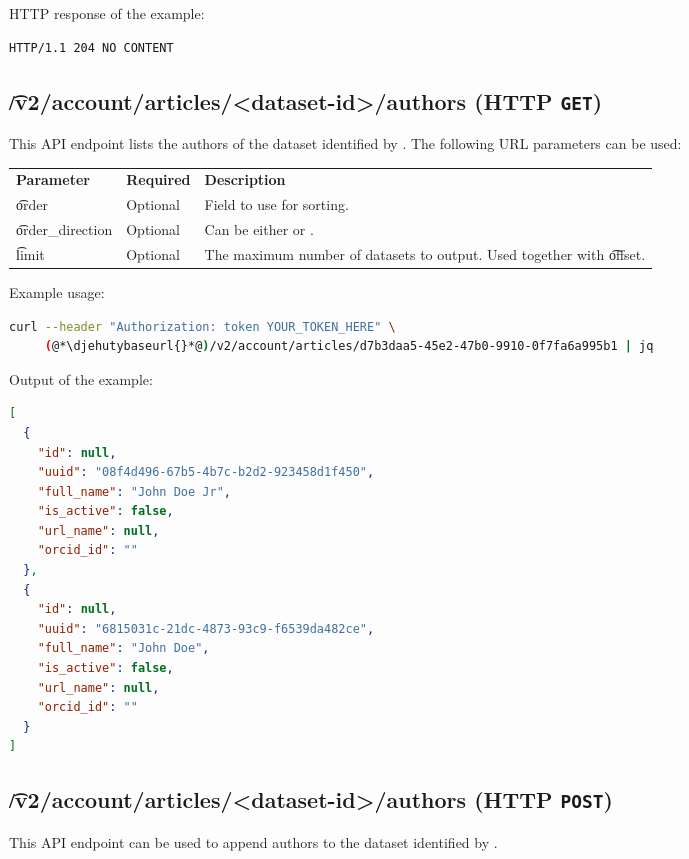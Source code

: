   HTTP response of the example:
\begin{lstlisting}
HTTP/1.1 204 NO CONTENT
\end{lstlisting}

\subsection{\t{/v2/account/articles/<dataset-id>/authors} (HTTP \texttt{GET})}
\label{sec:api-v2-articles-authors}

  This API endpoint lists the authors of the dataset identified by .
  The following URL parameters can be used:

\begin{tabularx}{\textwidth}{*{2}{!{\VRule[-1pt]}l}!{\VRule[-1pt]}X}
  \headrow
  \textbf{Parameter}   & \textbf{Required} & \textbf{Description}\\
  \t{order}            & Optional & Field to use for sorting.\\
  \t{order\_direction} & Optional & Can be either  or .\\
  \t{limit}            & Optional & The maximum number of datasets to output.
                                    Used together with \t{offset}.
\end{tabularx}

  Example usage:
\begin{lstlisting}[language=bash]
curl --header "Authorization: token YOUR_TOKEN_HERE" \
     (@*\djehutybaseurl{}*@)/v2/account/articles/d7b3daa5-45e2-47b0-9910-0f7fa6a995b1 | jq
\end{lstlisting}

  Output of the example:
\begin{lstlisting}[language=JSON]
[
  {
    "id": null,
    "uuid": "08f4d496-67b5-4b7c-b2d2-923458d1f450",
    "full_name": "John Doe Jr",
    "is_active": false,
    "url_name": null,
    "orcid_id": ""
  },
  {
    "id": null,
    "uuid": "6815031c-21dc-4873-93c9-f6539da482ce",
    "full_name": "John Doe",
    "is_active": false,
    "url_name": null,
    "orcid_id": ""
  }
]
\end{lstlisting}

\subsection{\t{/v2/account/articles/<dataset-id>/authors} (HTTP \texttt{POST})}
\label{sec:api-v2-articles-authors-post}

  This API endpoint can be used to append authors to the dataset identified
  by \code{dataset-id}.


